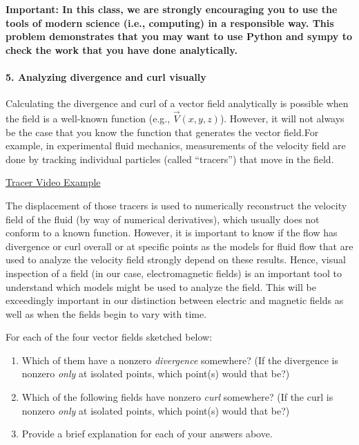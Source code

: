\documentclass[11pt]{article}
\def\tightlist{}
\begin{document}
\textbf{Important: In this class, we are strongly encouraging you to use
the tools of modern science (i.e., computing) in a responsible way. This
problem demonstrates that you may want to use Python and sympy to check
the work that you have done analytically.}

\paragraph{5. Analyzing divergence and curl
visually}\label{analyzing-divergence-and-curl-visually}

Calculating the divergence and curl of a vector field analytically is
possible when the field is a well-known function (e.g.,
\(\vec{V}(x,y,z)\)). However, it will not always be the case that you
know the function that generates the vector field.For example, in
experimental fluid mechanics, measurements of the velocity field are
done by tracking individual particles (called ``tracers'') that move in
the field.

\href{https://www.youtube.com/watch?v=hzvFHrWQbP0}{Tracer Video Example}

The displacement of those tracers is used to numerically reconstruct the
velocity field of the fluid (by way of numerical derivatives), which
usually does not conform to a known function. However, it is important
to know if the flow has divergence or curl overall or at specific points
as the models for fluid flow that are used to analyze the velocity field
strongly depend on these results. Hence, visual inspection of a field
(in our case, electromagnetic fields) is an important tool to understand
which models might be used to analyze the field. This will be
exceedingly important in our distinction between electric and magnetic
fields as well as when the fields begin to vary with time.

For each of the four vector fields sketched below:

\begin{enumerate}
\def\labelenumi{\arabic{enumi}.}
\tightlist
\item
  Which of them have a nonzero \emph{divergence} somewhere? (If the
  divergence is nonzero \emph{only} at isolated points, which point(s)
  would that be?)
\item
  Which of the following fields have nonzero \emph{curl} somewhere? (If
  the curl is nonzero \emph{only} at isolated points, which point(s)
  would that be?)
\item
  Provide a brief explanation for each of your answers above.
\end{enumerate}
\end{document}
